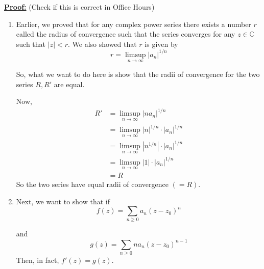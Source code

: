 \documentclass{article}
\newcommand{\C}{\mathbb{C}}
\begin{document}
\underline{\textbf{Proof:}} (Check if this is correct in Office Hours)

\begin{enumerate}[label=(\alph*)]
  \item Earlier, we proved that for any complex power series there exists a number $r$ called the radius of convergence such that the series converges for any $z \in \C$ such that $|z| < r$. We also showed that $r$ is given by 
  \[ r = \limsup_{n \rightarrow \infty} |a_n|^{1/n} \]

  So, what we want to do here is show that the radii of convergence for the two series $R, R'$ are equal.

  Now, 
  \begin{align*}
    R' &= \limsup_{n \rightarrow \infty} |n a_n|^{1/n} \\
    &= \limsup_{n \rightarrow \infty} |n|^{1/n} \cdot |a_n|^{1/n} \\
    &= \limsup_{n \rightarrow \infty} |n^{1/n}| \cdot |a_n|^{1/n} \\
    &= \limsup_{n \rightarrow \infty} |1| \cdot |a_n|^{1/n} \\
    &= R
  \end{align*}
  So the two series have equal radii of convergence $(=R)$.

  \item Next, we want to show that if 
  \[ f(z) = \sum_{n \geq 0} a_n(z - z_0)^n \]

  and 
  \[ g(z) = \sum_{n \geq 0} n a_n(z - z_0)^{n-1} \]
  Then, in fact, $f'(z) = g(z)$.
\end{enumerate}
\end{document}
